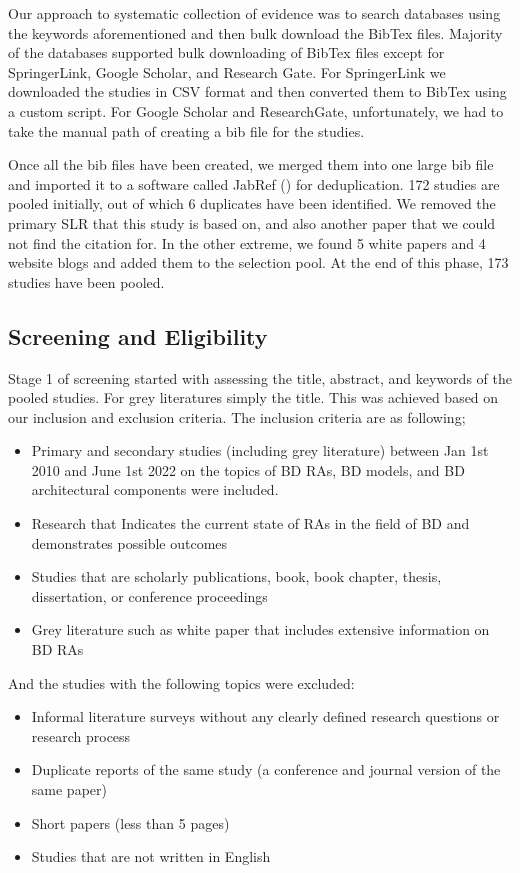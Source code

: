\documentclass{ieeeaccess}
\begin{document}
Our approach to systematic collection of evidence was to search databases using the keywords aforementioned and then bulk download the BibTex files. Majority of the databases supported bulk downloading of BibTex files except for SpringerLink, Google Scholar, and Research Gate. For SpringerLink we downloaded the studies in CSV format and then converted them to BibTex using a custom script. For Google Scholar and ResearchGate, unfortunately, we had to take the manual path of creating a bib file for the studies. 

Once all the bib files have been created, we merged them into one large bib file and imported it to a software called JabRef (\cite{JabRef}) for deduplication. 172 studies are pooled initially, out of which 6 duplicates have been identified. We removed the primary SLR that this study is based on, and also another paper that we could not find the citation for. In the other extreme, we found 5 white papers and 4 website blogs and added them to the selection pool. At the end of this phase, 173 studies have been pooled. 

\subsection{Screening and Eligibility}

Stage 1 of screening started with assessing the title, abstract, and keywords of the pooled studies. For grey literatures simply the title. This was achieved based on our inclusion and exclusion criteria. The inclusion criteria are as following;

\begin{itemize}
    \item Primary and secondary studies (including grey literature) between Jan 1st 2010 and June 1st 2022 on the topics of BD RAs, BD models, and BD architectural components were included. 
    \item Research that Indicates the current state of RAs in the field of BD and demonstrates possible outcomes
    \item Studies that are scholarly publications, book, book chapter, thesis, dissertation, or conference proceedings 
    \item Grey literature such as white paper that includes extensive information on BD RAs
\end{itemize}

And the studies with the following topics were excluded: 

\begin{itemize}
    \item Informal literature surveys without any clearly defined research questions or research process
    \item Duplicate reports of the same study (a conference and journal version of the same paper)
    \item Short papers (less than 5 pages)
    \item Studies that are not written in English
\end{itemize}
\end{document}
